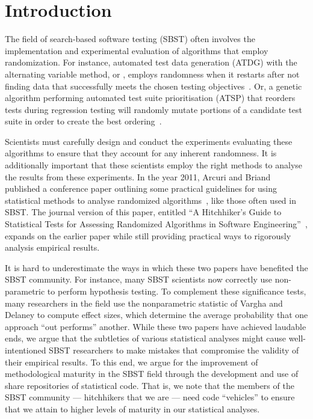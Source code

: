 
\section{Introduction}
\label{sec:introduction}

The field of search-based software testing (SBST) often involves the implementation and experimental evaluation of
algorithms that employ randomization. For instance, automated test data generation (ATDG) with the alternating variable
method, or \AVM, employs randomness when it restarts after not finding data that successfully meets the chosen
testing objectives~\cite{McMinn2015}. Or, a genetic algorithm performing automated test suite prioritisation (ATSP) that
reorders tests during regression testing will randomly mutate portions of a candidate test suite in order to
create the best ordering~\cite{Walcott2006}.

Scientists must carefully design and conduct the experiments evaluating these algorithms to ensure that they account for
any inherent randomness. It is additionally important that these scientists employ the right methods to analyse the results
from these experiments. In the year 2011, Arcuri and Briand published a conference paper outlining some practical
guidelines for using statistical methods to analyse randomized algorithms~\cite{Arcuri2011}, like those often used in
SBST. The journal version of this paper, entitled ``A Hitchhiker's Guide to Statistical Tests for
Assessing Randomized Algorithms in Software Engineering''~\cite{Arcuri2014}, expands on the earlier paper while still
providing practical ways to rigorously analysis empirical results.

It is hard to underestimate the ways in which these two papers have benefited the SBST community. For instance, many
SBST scientists now correctly use non-parametric \wilcoxon to perform hypothesis testing. To complement these
significance tests, many researchers in the field use the nonparametric \atwelve statistic of Vargha and Delaney
\cite{Vargha2000} to compute effect sizes, which determine the average probability that one approach ``out performs''
another. While these two papers have achieved laudable ends, we argue that the subtleties of various statistical
analyses might cause well-intentioned SBST researchers to make mistakes that compromise the validity of their empirical
results. To this end, we argue for the improvement of methodological maturity in the SBST field through the development
and use of share repositories of statistical code. That is, we note that the members of the SBST community ---
hitchhikers that we are --- need code ``vehicles'' to ensure that we attain to higher levels of maturity in our
statistical analyses.

